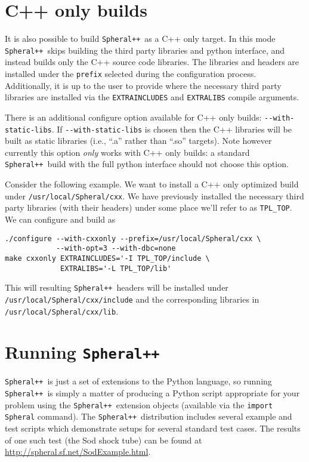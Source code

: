 \documentclass{article}
\newcommand{\Spheral}{{\tt Spheral++}}
\begin{document}
\section{C++ only builds}

It is also possible to build \Spheral\ as a C++ only target.  In this mode
\Spheral\ skips building the third party libraries and python interface, and
instead builds only the C++ source code libraries.  The libraries and headers
are installed under the \verb.prefix. selected during the configuration process.
Additionally, it is up to the user to provide where the necessary third party
libraries are installed via the \verb.EXTRAINCLUDES. and
\verb.EXTRALIBS. compile arguments.

There is an additional configure option available for C++ only builds:
\verb.--with-static-libs..  If \verb.--with-static-libs. is chosen then the C++
libraries will be built as static libraries (i.e., ``.a'' rather than ``.so''
targets).  Note however currently this option {\em only} works with C++ only
builds: a standard \Spheral\ build with the full python interface should not
choose this option.

Consider the following example.  We want to install a C++ only optimized build under
\verb./usr/local/Spheral/cxx..  We have previously installed the necessary
third party libraries (with their headers) under some place we'll refer to as
\verb.TPL_TOP..  We can configure and build as

\begin{verbatim}
./configure --with-cxxonly --prefix=/usr/local/Spheral/cxx \
            --with-opt=3 --with-dbc=none 
make cxxonly EXTRAINCLUDES='-I TPL_TOP/include \
             EXTRALIBS='-L TPL_TOP/lib'
\end{verbatim}

This will resulting \Spheral\ headers will be installed under
\verb./usr/local/Spheral/cxx/include. and the corresponding libraries in
\verb./usr/local/Spheral/cxx/lib..

\section{Running \Spheral}
\Spheral\ is just a set of extensions to the Python language, so running
\Spheral\ is simply a matter of producing a Python script appropriate for your
problem using the \Spheral\ extension objects (available via the
\verb+import Spheral+ command).  The \Spheral\ distribution includes several
example and test scripts which demonstrate setups for several standard test
cases.  The results of one such test (the Sod shock tube) can be found
at \newline \url{http://spheral.sf.net/SodExample.html}.
\end{document}
